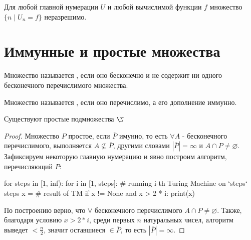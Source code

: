 \begin{cor}
	Для любой главной нумерации $ U$ и любой вычислимой функции $ f$  множество $ \{n \mid U_n = f\}$ неразрешимо.
\end{cor}

\section{Иммунные и простые множества}

\begin{defn}
    Множество называется , если оно бесконечно и не содержит ни одного бесконечного перечислимого множества.
\end{defn}

\begin{defn}
    Множество называется , если оно перечислимо, а его дополнение иммунно.
\end{defn}

\begin{thm}
    Существуют простые подмножества $ \N$
\end{thm}
\begin{proof}
    Множество $ P$ простое, если $ \overline P$ имунно, то есть $ \forall A$ - бесконечного перечислимого, выполняется $ A \nsubseteq \overline P$, другими словами $ |\overline P| = \infty$ и $ A \cap P \neq \varnothing$. \\
    Зафиксируем некоторую главную нумерацию и явно построим алгоритм, перечисляющий $ P$:
    
    \begin{python}
for steps in [1, inf):
    for i in [1, steps]:
        # running i-th Turing Machine on `steps` steps
        x = # result of TM
        if x != None and x > 2 * i:
            print(x)
\end{python}

  \par По построению верно, что $ \forall$ бесконечного перечислимого $ A \cap P \neq \varnothing$. Также, благодаря условию $ x > 2 * i$, среди первых $ n$ натуральных чисел, алгоритм выведет $ < \frac{n}{2}$, значит оставшиеся $ \in \overline P$, то есть $ |\overline P| = \infty$.
\end{proof}

